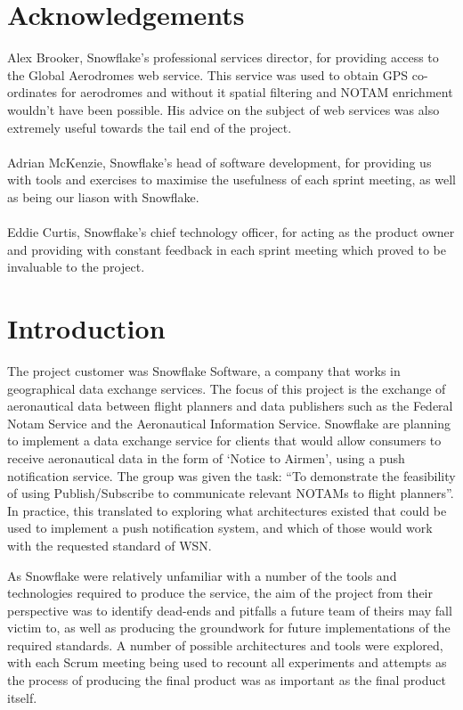 \documentclass[a4paper, 12pt, twoside]{article}
\begin{document}
\section*{Acknowledgements}
Alex Brooker, Snowflake's professional services director, for providing access to the Global Aerodromes web service. This service was used to obtain GPS co-ordinates for aerodromes and without it spatial filtering and NOTAM enrichment wouldn't have been possible. His advice on the subject of web services was also extremely useful towards the tail end of the project.
\\\\
Adrian McKenzie, Snowflake's head of software development, for providing us with tools and exercises to maximise the usefulness of each sprint meeting, as well as being our liason with Snowflake.
\\\\
Eddie Curtis, Snowflake's chief technology officer, for acting as the product owner and providing with constant feedback in each sprint meeting which proved to be invaluable to the project.

\newpage

\tableofcontents
\newpage

\listoffigures
\newpage

\section{Introduction}
\label{sec:introduction}

The project customer was Snowflake Software, a company that works in geographical data exchange services. The focus of this project is the exchange of aeronautical data between flight planners and data publishers such as the Federal Notam Service and the Aeronautical Information Service. Snowflake are planning to implement a data exchange service for clients that would allow consumers to receive aeronautical data in the form of `Notice to Airmen', using a push notification service. The group was given the task: ``To demonstrate the feasibility of using Publish/Subscribe to communicate relevant NOTAMs to flight planners''. In practice, this translated to exploring what architectures existed that could be used to implement a push notification system, and which of those would work with the requested standard of WSN.

As Snowflake were relatively unfamiliar with a number of the tools and technologies required to produce the service, the aim of the project from their perspective was to identify dead-ends and pitfalls a future team of theirs may fall victim to, as well as producing the groundwork for future implementations of the required standards. A number of possible architectures and tools were explored, with each Scrum meeting being used to recount all experiments and attempts as the process of producing the final product was as important as the final product itself.
\end{document}

